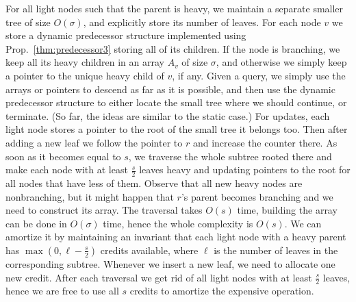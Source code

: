 \documentclass[11pt,onecolumn,final]{article} \usepackage{a4}
\theoremstyle{plain}
\theoremstyle{remark}
\begin{document}
For all light nodes such that the parent is heavy, we maintain a separate smaller tree of size $O(\sigma)$, and explicitly store its number of leaves. For each node $v$ we store a dynamic predecessor structure implemented using Prop.~\ref{thm:predecessor3} storing all of its children. If the node is branching, we keep all its heavy children in an array $A_{v}$ of size $\sigma$, and otherwise we simply keep a pointer to the unique heavy child of $v$, if any. Given a query, we simply use the arrays or pointers to descend as far as it is possible, and then use the dynamic predecessor structure to either locate the small tree where we should continue, or terminate. (So far, the ideas are similar to the static case.) For updates, each light node stores a pointer to the root of the small tree it belongs too. Then after adding a new leaf we follow the pointer to $r$ and increase the counter there. As soon as it becomes equal to $s$, we traverse the whole subtree rooted there and make each node with at least $\frac{s}{2}$ leaves heavy and updating pointers to the root for all nodes that have less of them. Observe that all new heavy nodes are nonbranching, but it might happen that $r$'s parent becomes branching and we need to construct its array. The traversal takes $O(s)$ time, building the array can be done in $O(\sigma)$ time, hence the whole complexity is $O(s)$. We can amortize it by maintaining an invariant that each light node with a heavy parent has $\max(0,\ell-\frac{s}{2})$ credits available, where $\ell$ is the number of leaves in the corresponding subtree. Whenever we insert a new leaf, we need to allocate one new credit. After each traversal we get rid of all light nodes with at least $\frac{s}{2}$ leaves, hence we are free to use all $s$ credits to amortize the expensive operation.
\end{document}

